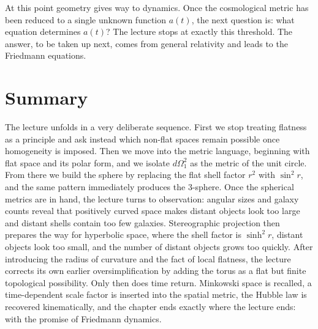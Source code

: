 At this point geometry gives way to dynamics. Once the cosmological metric has been reduced to a single unknown function \(a(t)\), the next question is: what equation determines \(a(t)\)? The lecture stops at exactly this threshold. The answer, to be taken up next, comes from general relativity and leads to the Friedmann equations.

\section{Summary}

The lecture unfolds in a very deliberate sequence. First we stop treating flatness as a principle and ask instead which non-flat spaces remain possible once homogeneity is imposed. Then we move into the metric language, beginning with flat space and its polar form, and we isolate \(d\Omega_1^2\) as the metric of the unit circle. From there we build the sphere by replacing the flat shell factor \(r^2\) with \(\sin^2 r\), and the same pattern immediately produces the \(3\)-sphere. Once the spherical metrics are in hand, the lecture turns to observation: angular sizes and galaxy counts reveal that positively curved space makes distant objects look too large and distant shells contain too few galaxies. Stereographic projection then prepares the way for hyperbolic space, where the shell factor is \(\sinh^2 r\), distant objects look too small, and the number of distant objects grows too quickly. After introducing the radius of curvature and the fact of local flatness, the lecture corrects its own earlier oversimplification by adding the torus as a flat but finite topological possibility. Only then does time return. Minkowski space is recalled, a time-dependent scale factor is inserted into the spatial metric, the Hubble law is recovered kinematically, and the chapter ends exactly where the lecture ends: with the promise of Friedmann dynamics.
